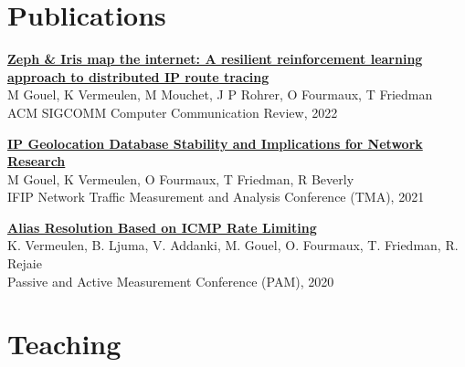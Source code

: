 \documentclass[11pt,a4paper,sans]{moderncv} %
\begin{document}

\section{Publications}

\href{https://hal.archives-ouvertes.fr/hal-03597580/document}{\textbf{Zeph \& Iris map the internet: A resilient reinforcement learning approach to distributed IP route tracing}}\\
M Gouel, K Vermeulen, M Mouchet, J P Rohrer, O Fourmaux, T Friedman\\
ACM SIGCOMM Computer Communication Review, 2022

\vspace{0.25cm}
\href{https://dl.ifip.org/db/conf/tma/tma2021/tma2021-paper2.pdf}{\textbf{IP Geolocation Database Stability and Implications for Network Research}}\\
M Gouel, K Vermeulen, O Fourmaux, T Friedman, R Beverly\\
IFIP Network Traffic Measurement and Analysis Conference (TMA), 2021

\vspace{0.25cm}
\href{https://arxiv.org/pdf/2002.00252.pdf}{\textbf{Alias Resolution Based on ICMP Rate Limiting}} \\
K. Vermeulen, B. Ljuma, V. Addanki, M. Gouel, O. Fourmaux, T. Friedman, R. Rejaie\\
Passive and Active Measurement Conference (PAM), 2020


\section{Teaching}

\end{document}
